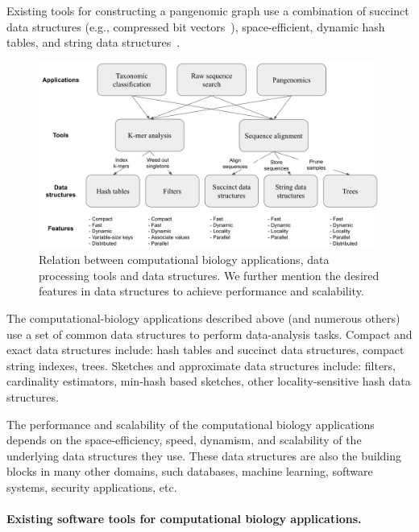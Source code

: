 \begin{itemize}[leftmargin=*]
Existing tools for constructing a pangenomic graph use a combination of succinct data structures (e.g., compressed bit vectors~\cite{garrison2018variation}), space-efficient, dynamic hash tables, and string data structures~\cite{pandey2021variantstore}.

\end{itemize}

\setlength\intextsep{0pt}
\begin{figure}
\vspace{-5pt}
\centering
\includegraphics[width=4.4in]{images/PPOSS_App_DS.png}
\caption{Relation between computational biology applications, data processing tools and data structures. We further mention the desired features in data structures to achieve performance and scalability.}
\label{fig1}
\end{figure}


The computational-biology applications described above (and numerous others)  use a set of common data structures to perform data-analysis tasks.
Compact and exact data structures include: hash tables and succinct data structures, compact string indexes, trees.
Sketches and approximate data structures include: filters, cardinality estimators,  min-hash based sketches, other locality-sensitive hash data structures.

The performance and scalability of the computational biology applications
depends on the space-efficiency, speed, dynamism, and scalability of the
underlying data structures they use. These data structures are also the building
blocks in many other domains, such databases, machine learning, software
systems, security applications, etc.


\paragraph{Existing software tools for computational biology applications.}

